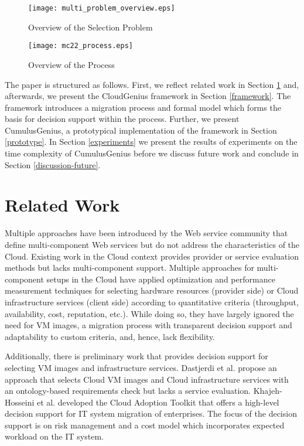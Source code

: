 \documentclass[10pt]{article}
\begin{document}
\begin{figure}[t]
\centering
\texttt{[image: multi\_problem\_overview.eps]} 
\caption{Overview of the Selection Problem}\label{overview-selection}
\end{figure}


\begin{figure}
\centering
\texttt{[image: mc22\_process.eps]} 
\caption{Overview of the  Process}\label{mc22-process}
\end{figure}

The paper is structured as follows. First, we reflect related work in Section \ref{related} and, afterwards, we present the CloudGenius framework in Section \ref{framework}. The framework introduces a migration process and formal model which forms the basis for decision support within the process. Further, we present CumulusGenius, a prototypical implementation of the framework in Section \ref{prototype}. In Section \ref{experiments} we present the results of experiments on the time complexity of CumulusGenius before we discuss future work and conclude in Section \ref{discussion-future}.


\section{Related Work}\label{related}

Multiple approaches have been introduced by the Web service community that define multi-component Web services \cite{hamadi2003petri}\cite{zhang2008colored} but do not address the characteristics of the Cloud.
Existing work in the Cloud context provides provider or service evaluation methods but lacks multi-component support\cite{chan2010ranking}.
Multiple approaches for multi-component setups in the Cloud have applied optimization \cite{ye2011genetic}\cite{SPE:SPE1032}\cite{Goudarzi_Pedram}\cite{hajjat2010cloudward} and performance measurement techniques \cite{li2010cloudcmp} for selecting hardware resources (provider side) or Cloud infrastructure services (client side) according to quantitative criteria (throughput, availability, cost, reputation, etc.). While doing so, they have largely ignored the need for VM images, a migration process with transparent decision support and adaptability to custom criteria, and, hence, lack flexibility.

Additionally, there is preliminary work that provides decision support for selecting VM images and infrastructure services. Dastjerdi et al. \cite{dastjerdi2010effective} propose an approach that selects Cloud VM images and Cloud infrastructure services with an ontology-based requirements check but lacks a service evaluation.
Khajeh-Hosseini et al. \cite{khajeh2010cloud} \cite{khajeh2011decision} developed the Cloud Adoption Toolkit that offers a high-level decision support for IT system migration of enterprises. The focus of the decision support is on risk management and a cost model which incorporates expected workload on the IT system.
\end{document}
